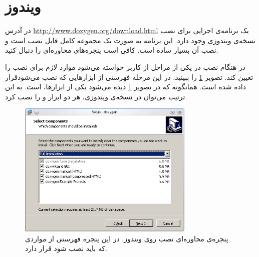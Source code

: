 %
% 
% 
% 
%
\section{ویندوز}

در آدرس
\url{http://www.doxygen.org/download.html} 
یک برنامه‌ی اجرایی برای نصب نسخه‌ی ویندوزی وجود دارد. این برنامه به صورت یک
مجموعه کامل قابل نصب است و نصب آن بسیار ساده است.
کافی است پنجره‌های محاوره‌ای را دنبال کنید.



در هنگام نصب در یکی از مراحل از کاربر خواسته می‌شود موارد لازم برای نصب را تعیین کند. 
تصویر \ref{پنجره_نصب_روی_ویندوز} را ببینید. در این مرحله 
فهرستی از ابزارهایی که نصب می‌شودقرار داده شده است. 
همانگونه که در تصویر \ref{پنجره_نصب_روی_ویندوز} دیده می‌شود یکی از ابزارها،  است. 
به این ترتیب می‌توان در نسخه‌ی ویندوزی، هر دو ابزار  و  را نصب کرد.

\begin{figure}
\centering
\includegraphics[width=0.75\textwidth]{image/windows_setup}
\caption[
پنجره‌ی محاوره‌ای نصب
{}
 روی ویندوز
]{
پنجره‌ی محاوره‌ای نصب
{}
 روی ویندوز. در این پنجره فهرستی از مواردی که باید نصب شود قرار دارد.
}
\label{پنجره_نصب_روی_ویندوز}
\end{figure}

